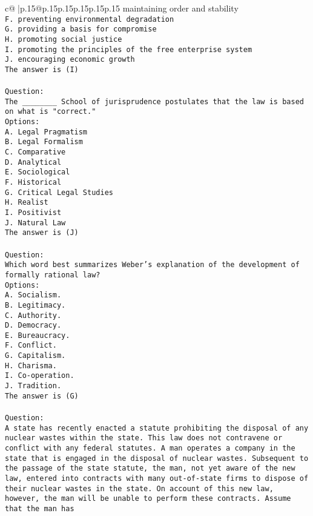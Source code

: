 \documentclass{article}
\begin{document}
{\begin{supertabular}{c@{$\;$}|p{.15\linewidth}@{}p{.15\linewidth}p{.15\linewidth}p{.15\linewidth}p{.15\linewidth}p{.15\linewidth}}
{{{maintaining order and stability\\ \tt F. preventing environmental degradation\\ \tt G. providing a basis for compromise\\ \tt H. promoting social justice\\ \tt I. promoting the principles of the free enterprise system\\ \tt J. encouraging economic growth\\ \tt The answer is (I)\\ \tt \\ \tt Question:\\ \tt The ________ School of jurisprudence postulates that the law is based on what is "correct."\\ \tt Options:\\ \tt A. Legal Pragmatism\\ \tt B. Legal Formalism\\ \tt C. Comparative\\ \tt D. Analytical\\ \tt E. Sociological\\ \tt F. Historical\\ \tt G. Critical Legal Studies\\ \tt H. Realist\\ \tt I. Positivist\\ \tt J. Natural Law\\ \tt The answer is (J)\\ \tt \\ \tt Question:\\ \tt Which word best summarizes Weber's explanation of the development of formally rational law?\\ \tt Options:\\ \tt A. Socialism.\\ \tt B. Legitimacy.\\ \tt C. Authority.\\ \tt D. Democracy.\\ \tt E. Bureaucracy.\\ \tt F. Conflict.\\ \tt G. Capitalism.\\ \tt H. Charisma.\\ \tt I. Co-operation.\\ \tt J. Tradition.\\ \tt The answer is (G)\\ \tt \\ \tt Question:\\ \tt A state has recently enacted a statute prohibiting the disposal of any nuclear wastes within the state. This law does not contravene or conflict with any federal statutes. A man operates a company in the state that is engaged in the disposal of nuclear wastes. Subsequent to the passage of the state statute, the man, not yet aware of the new law, entered into contracts with many out-of-state firms to dispose of their nuclear wastes in the state. On account of this new law, however, the man will be unable to perform these contracts. Assume that the man has }}}
\end{supertabular}}
\end{document}

